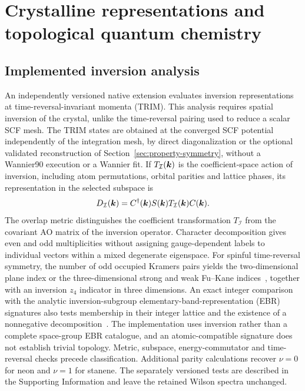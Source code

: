 \section{Crystalline representations and topological quantum chemistry}
\label{sec:tqc}
\subsection{Implemented inversion analysis}
An independently versioned native extension evaluates inversion
representations at time-reversal-invariant momenta (TRIM). This analysis
requires spatial inversion of the crystal, unlike the time-reversal
pairing used to reduce a scalar SCF mesh. The TRIM states are obtained at
the converged SCF potential independently of the integration mesh,
by direct diagonalization or the optional validated reconstruction of
Section~\ref{sec:property-symmetry}, without a Wannier90 execution or
a Wannier fit. If
$T_{\mathcal I}(\bm{k})$ is the coefficient-space action of inversion,
including atom permutations, orbital parities and lattice phases, its
representation in the selected subspace is
\begin{equation}
 D_{\mathcal I}(\bm{k})=C^\dagger(\bm{k})S(\bm{k})
                   T_{\mathcal I}(\bm{k})C(\bm{k}).
 \label{eq:topology-inversion}
\end{equation}
The overlap metric distinguishes the coefficient transformation
$T_{\mathcal I}$ from the covariant AO matrix of the inversion operator.
Character decomposition gives even and odd multiplicities without
assigning gauge-dependent labels to individual vectors within a mixed
degenerate eigenspace. For spinful time-reversal symmetry, the number of
odd occupied Kramers pairs yields the two-dimensional plane index or
the three-dimensional strong and weak Fu--Kane
indices~\cite{FuKane2007}, together with an inversion $z_4$ indicator
in three dimensions. An exact integer comparison with the analytic
inversion-subgroup elementary-band-representation (EBR) signatures also
tests membership in their integer lattice and the existence of a
nonnegative decomposition~\cite{Bradlyn2017,Po2017}. The implementation
uses inversion rather than a complete space-group EBR catalogue, and an
atomic-compatible signature does not establish trivial topology.
Metric, subspace, energy-commutator and time-reversal checks precede
classification. Additional parity calculations recover $\nu=0$ for
neon and $\nu=1$ for stanene. The separately versioned tests are described
in the Supporting Information and leave the retained Wilson spectra
unchanged.


